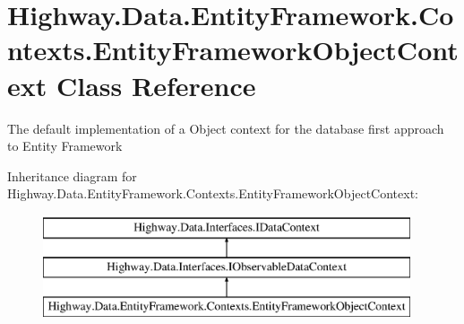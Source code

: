 \hypertarget{class_highway_1_1_data_1_1_entity_framework_1_1_contexts_1_1_entity_framework_object_context}{\section{Highway.\-Data.\-Entity\-Framework.\-Contexts.\-Entity\-Framework\-Object\-Context Class Reference}
\label{class_highway_1_1_data_1_1_entity_framework_1_1_contexts_1_1_entity_framework_object_context}
}


The default implementation of a Object context for the database first approach to Entity Framework  


Inheritance diagram for Highway.\-Data.\-Entity\-Framework.\-Contexts.\-Entity\-Framework\-Object\-Context\-:\begin{figure}[H]
\begin{center}
\leavevmode
\includegraphics[height=3.000000cm]{class_highway_1_1_data_1_1_entity_framework_1_1_contexts_1_1_entity_framework_object_context}
\end{center}
\end{figure}
